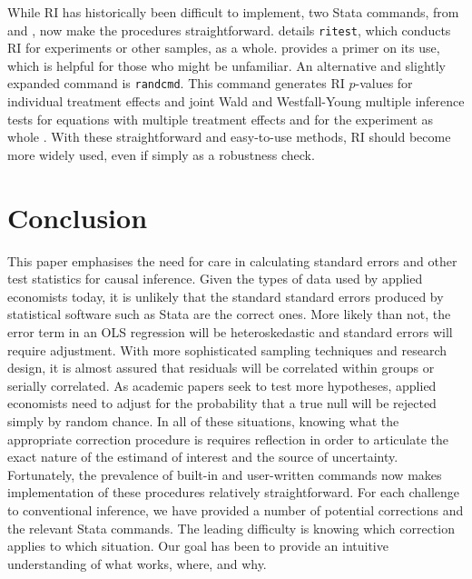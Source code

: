 \documentclass[11pt]{article}
\begin{document}
While RI has historically been difficult to implement, two Stata commands, from \cite{hes_randomization_2017} and \cite{young_randcmd_2020}, now make the procedures straightforward. \cite{hes_randomization_2017} details \texttt{ritest}, which conducts RI for experiments or other samples, as a whole. \cite{mckenzie_finally_2017} provides a primer on its use, which is helpful for those who might be unfamiliar. An alternative and slightly expanded command is \texttt{randcmd}. This command generates RI $p$-values for individual treatment effects and joint Wald and Westfall-Young multiple inference tests for equations with multiple treatment effects and for the experiment as whole \citep{young_randcmd_2020}. With these straightforward and easy-to-use methods, RI should become more widely used, even if simply as a robustness check. 



\section{Conclusion}

This paper emphasises the need for care in calculating standard errors and other test statistics for causal inference. Given the types of data used by applied economists today, it is unlikely that the standard standard errors produced by statistical software such as Stata are the correct ones. More likely than not, the error term in an OLS regression will be heteroskedastic and standard errors will require adjustment. With more sophisticated sampling techniques and research design, it is almost assured that residuals will be correlated within groups or serially correlated. As academic papers seek to test more hypotheses, applied economists need to adjust for the probability that a true null will be rejected simply by random chance. In all of these situations, knowing what the appropriate correction procedure is requires reflection in order to articulate the exact nature of the estimand of interest and the source of uncertainty. Fortunately, the prevalence of built-in and user-written commands now makes implementation of these procedures relatively straightforward. For each challenge to conventional inference, we have provided a number of potential corrections and the relevant Stata commands. The leading difficulty is knowing which correction applies to which situation. Our goal has been to provide an intuitive understanding of what works, where, and why.
\end{document}

